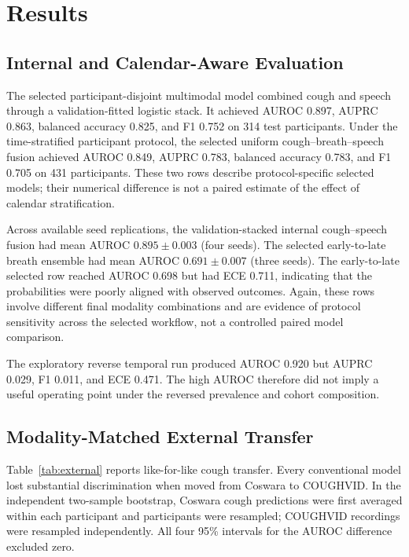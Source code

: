 \section{Results}

\subsection{Internal and Calendar-Aware Evaluation}

The selected participant-disjoint multimodal model combined cough and speech
through a validation-fitted logistic stack. It achieved AUROC 0.897, AUPRC
0.863, balanced accuracy 0.825, and F1 0.752 on 314 test participants. Under the
time-stratified participant protocol, the selected uniform cough--breath--speech
fusion achieved AUROC 0.849, AUPRC 0.783, balanced accuracy 0.783, and F1 0.705
on 431 participants. These two rows describe protocol-specific selected models;
their numerical difference is not a paired estimate of the effect of calendar
stratification.

Across available seed replications, the validation-stacked internal
cough--speech fusion had mean AUROC $0.895\pm0.003$ (four seeds). The selected
early-to-late breath ensemble had mean AUROC $0.691\pm0.007$ (three seeds).
The early-to-late selected row reached AUROC 0.698 but had ECE 0.711, indicating
that the probabilities were poorly aligned with observed outcomes. Again,
these rows involve different final modality combinations and are evidence of
protocol sensitivity across the selected workflow, not a controlled paired
model comparison.

The exploratory reverse temporal run produced AUROC 0.920 but AUPRC 0.029,
F1 0.011, and ECE 0.471. The high AUROC therefore did not imply a useful
operating point under the reversed prevalence and cohort composition.

\subsection{Modality-Matched External Transfer}

Table~\ref{tab:external} reports like-for-like cough transfer. Every
conventional model lost substantial discrimination when moved from Coswara to
COUGHVID. In the independent two-sample bootstrap, Coswara cough predictions
were first averaged within each participant and participants were resampled;
COUGHVID recordings were resampled independently. All four 95\% intervals for
the AUROC difference excluded zero.

